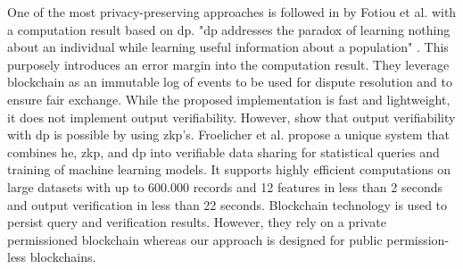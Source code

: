One of the most privacy-preserving approaches is followed in \cite{fotiouPrivacypreservingStatisticsMarketplace2021} by Fotiou et al. with a computation result based on \acrfull{dp}. "\acrshort{dp} addresses the paradox of learning nothing about an individual while learning useful information about a population" \cite{tsaloliDifferentialPrivacyMeets}. This purposely introduces an error margin into the computation result. They leverage blockchain as an immutable log of events to be used for dispute resolution and to ensure fair exchange. While the proposed implementation is fast and lightweight, it does not implement output verifiability. However, \cite{tsaloliDifferentialPrivacyMeets,narayanVerifiableDifferentialPrivacy2015} show that output verifiability with \acrshort{dp} is possible by using \acrshort{zkp}'s. Froelicher et al. \cite{froelicherDrynxDecentralizedSecure2020} propose a unique system that combines \acrshort{he}, \acrshort{zkp}, and \acrshort{dp} into verifiable data sharing for statistical queries and training of machine learning models. It supports highly efficient computations on large datasets with up to 600.000 records and 12 features in less than 2 seconds and output verification in less than 22 seconds. Blockchain technology is used to persist query and verification results. However, they rely on a private permissioned blockchain whereas our approach is designed for public permission-less blockchains.

